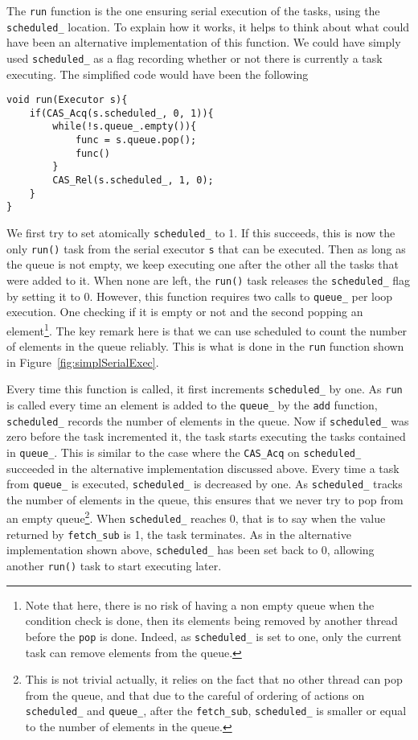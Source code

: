 The \texttt{run} function is the one ensuring serial execution of the tasks, using the \texttt{scheduled\_} location. To explain how it works, it helps to think about what could have been an alternative implementation of this function. We could have simply used \texttt{scheduled\_} as a flag recording whether or not there is currently a task executing. The simplified code would have been the following

\begin{lstlisting}
void run(Executor s){
	if(CAS_Acq(s.scheduled_, 0, 1)){
		while(!s.queue_.empty()){
			func = s.queue.pop();
			func()
		}
		CAS_Rel(s.scheduled_, 1, 0);
	}
}
\end{lstlisting}

We first try to set atomically \texttt{scheduled\_} to 1. If this succeeds, this is now the only \texttt{run()} task from the serial executor \texttt{s} that can be executed. Then as long as the queue is not empty, we keep executing one after the other all the tasks that were added to it. When none are left, the \texttt{run()} task releases the \texttt{scheduled\_} flag by setting it to 0. However, this function requires two calls to \texttt{queue\_} per loop execution. One checking if it is empty or not and the second popping an element\footnote{Note that here, there is no risk of having a non empty queue when the condition check is done, then its elements being removed by another thread before the \texttt{pop} is done. Indeed, as \texttt{scheduled\_} is set to one, only the current task can remove elements from the queue.}. The key remark here is that we can use scheduled to count the number of elements in the queue reliably. This is what is done in the \texttt{run} function shown in Figure~\ref{fig:simplSerialExec}.

Every time this function is called, it first increments \texttt{scheduled\_} by one. As \texttt{run} is called every time an element is added to the \texttt{queue\_} by the \texttt{add} function, \texttt{scheduled\_} records the number of elements in the queue. Now if \texttt{scheduled\_} was zero before the task incremented it, the task starts executing the tasks contained in \texttt{queue\_}. This is similar to the case where the \texttt{CAS\_Acq} on \texttt{scheduled\_} succeeded in the alternative implementation discussed above. Every time a task from \texttt{queue\_} is executed, \texttt{scheduled\_} is decreased by one. As \texttt{scheduled\_} tracks the number of elements in the queue, this ensures that we never try to pop from an empty queue\footnote{This is not trivial actually, it relies on the fact that no other thread can pop from the queue, and that due to the careful of ordering of actions on \texttt{scheduled\_} and \texttt{queue\_}, after the \texttt{fetch\_sub}, \texttt{scheduled\_} is smaller or equal to the number of elements in the queue.}. When \texttt{scheduled\_} reaches 0, that is to say when the value returned by \texttt{fetch\_sub} is 1, the task terminates. As in the alternative implementation shown above, \texttt{scheduled\_} has been set back to 0, allowing another \texttt{run()} task to start executing later.

